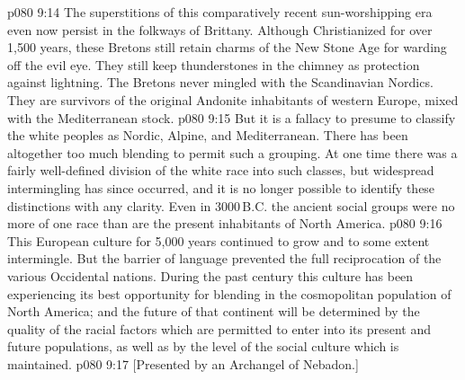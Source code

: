 \vs p080 9:14 The superstitions of this comparatively recent sun\hyp{}worshipping era even now persist in the folkways of Brittany. Although Christianized for over 1,500 years, these Bretons still retain charms of the New Stone Age for warding off the evil eye. They still keep thunderstones in the chimney as protection against lightning. The Bretons never mingled with the Scandinavian Nordics. They are survivors of the original Andonite inhabitants of western Europe, mixed with the Mediterranean stock.
\vs p080 9:15 \pc But it is a fallacy to presume to classify the white peoples as Nordic, Alpine, and Mediterranean. There has been altogether too much blending to permit such a grouping. At one time there was a fairly well\hyp{}defined division of the white race into such classes, but widespread intermingling has since occurred, and it is no longer possible to identify these distinctions with any clarity. Even in 3000\,B.C. the ancient social groups were no more of one race than are the present inhabitants of North America.
\vs p080 9:16 This European culture for 5,000 years continued to grow and to some extent intermingle. But the barrier of language prevented the full reciprocation of the various Occidental nations. During the past century this culture has been experiencing its best opportunity for blending in the cosmopolitan population of North America; and the future of that continent will be determined by the quality of the racial factors which are permitted to enter into its present and future populations, as well as by the level of the social culture which is maintained.
\vsetoff
\vs p080 9:17 [Presented by an Archangel of Nebadon.]
